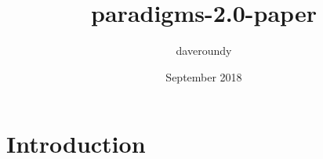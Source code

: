 \documentclass{article}
\title{paradigms-2.0-paper}
\author{daveroundy }
\date{September 2018}
\begin{document}
\maketitle

\section{Introduction}
\end{document}

